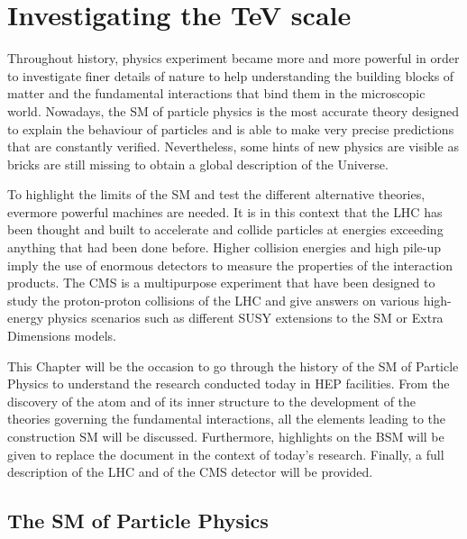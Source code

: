 \renewcommand\evenpagerightmark{{\scshape\small Chapter 2}}
\renewcommand\oddpageleftmark{{\scshape\small Investigating the \si{TeV} scale}}

\renewcommand{\bibname}{References}

\hyphenation{}

\chapter[Investigating the \si{TeV} scale]%
{Investigating the \si{TeV} scale}
\label{chapt:2}

	Throughout history, physics experiment became more and more powerful in order to investigate finer details of nature to help understanding the building blocks of matter and the fundamental interactions that bind them in the microscopic world. Nowadays, the \acl{SM} of particle physics is the most accurate theory designed to explain the behaviour of particles and is able to make very precise predictions that are constantly verified. Nevertheless, some hints of new physics are visible as bricks are still missing to obtain a global description of the Universe.
	
	To highlight the limits of the SM and test the different alternative theories, evermore powerful machines are needed. It is in this context that the \acl{LHC} has been thought and built to accelerate and collide particles at energies exceeding anything that had been done before. Higher collision energies and high pile-up imply the use of enormous detectors to measure the properties of the interaction products. The \acl{CMS} is a multipurpose experiment that have been designed to study the proton-proton collisions of the LHC and give answers on various high-energy physics scenarios such as different \acf{SUSY} extensions to the \acl{SM} or Extra Dimensions models.
	
	This Chapter will be the occasion to go through the history of the \acl{SM} of Particle Physics to understand the research conducted today in \acf{HEP} facilities. From the discovery of the atom and of its inner structure to the development of the theories governing the fundamental interactions, all the elements leading to the construction SM will be discussed. Furthermore, highlights on the \acf{BSM} will be given to replace the document in the context of today's research.  Finally, a full description of the LHC and of the CMS detector will be provided.

\section{The \acl{SM} of Particle Physics}
\label{chapt2:sec:SM}

